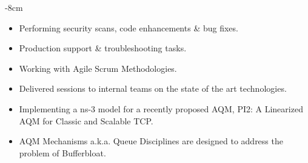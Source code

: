 \documentclass[10pt,a4paper]{altacv}
\begin{document}

\begin{adjustwidth}{}{-8cm}
\makecvheader
\end{adjustwidth}


\begin{itemize}

\item Performing security scans, code enhancements \& bug fixes.
\item Production support \& troubleshooting tasks.
\item Working with Agile Scrum Methodologies.
\item Delivered sessions to internal teams on the state of the art technologies.
\end{itemize}

\divider


\begin{itemize}
\item Implementing a ns-3 model for a recently proposed AQM, PI2: A Linearized AQM for Classic and Scalable TCP.
\item AQM Mechanisms a.k.a. Queue Disciplines are designed to address the problem of Bufferbloat.
\end{itemize}
\end{document}
